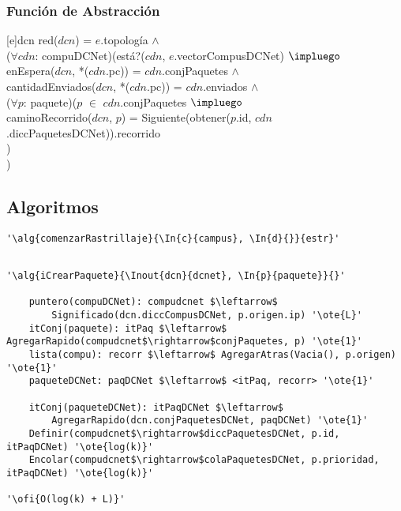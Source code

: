 \subsubsection{Funci\'on de Abstracci\'on}

[e]{dcn}{
red($dcn$) = $e$.topología $\land$ \\
($\forall cdn$: compuDCNet)(está?($cdn$, $e$.vectorCompusDCNet) $\impluego$ \\
\- enEspera($dcn$, *($cdn$.pc)) = $cdn$.conjPaquetes $\land$ \\
\- cantidadEnviados($dcn$, *($cdn$.pc)) = $cdn$.enviados $\land$ \\
\- ($\forall p$: paquete)($p$ $\in$ $cdn$.conjPaquetes $\impluego$ \\
\- \- caminoRecorrido($dcn$, $p$) = Siguiente(obtener($p$.id,
	$cdn$.diccPaquetesDCNet)).recorrido \\
\- ) \\
)
}

\subsection{Algoritmos}

\lstset{style=alg}

\begin{lstlisting}[mathescape]
'\alg{comenzarRastrillaje}{\In{c}{campus}, \In{d}{}}{estr}' 
   
\end{lstlisting}

\begin{lstlisting}[mathescape]
'\alg{iCrearPaquete}{\Inout{dcn}{dcnet}, \In{p}{paquete}}{}'

	puntero(compuDCNet): compudcnet $\leftarrow$
		Significado(dcn.diccCompusDCNet, p.origen.ip) '\ote{L}'
	itConj(paquete): itPaq $\leftarrow$ AgregarRapido(compudcnet$\rightarrow$conjPaquetes, p) '\ote{1}'
	lista(compu): recorr $\leftarrow$ AgregarAtras(Vacia(), p.origen) '\ote{1}'
	paqueteDCNet: paqDCNet $\leftarrow$ <itPaq, recorr> '\ote{1}'

	itConj(paqueteDCNet): itPaqDCNet $\leftarrow$
		AgregarRapido(dcn.conjPaquetesDCNet, paqDCNet) '\ote{1}'
	Definir(compudcnet$\rightarrow$diccPaquetesDCNet, p.id, itPaqDCNet) '\ote{log(k)}'
	Encolar(compudcnet$\rightarrow$colaPaquetesDCNet, p.prioridad, itPaqDCNet) '\ote{log(k)}'

'\ofi{O(log(k) + L)}'
\end{lstlisting}

